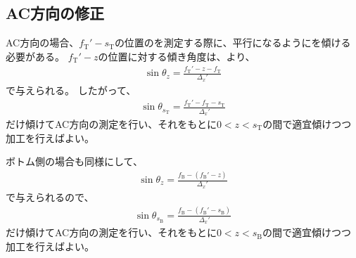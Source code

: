 \subsection{AC方向\OuterDiameter の修正}
AC方向の場合、$f_\mathrm T'-s_\mathrm T$の位置の\OuterDiameter を測定する際に、平行になるように\Table を傾ける必要がある。
$f_\mathrm T'-z$の位置に対する傾き角度は、より、
\begin{align*}
  \sin\theta_z = \frac{f_\mathrm T'-z-f_\mathrm T}{\Delta_x'}
\end{align*}
で与えられる。
したがって、
\begin{align*}
  \sin\theta_{s_\mathrm T} = \frac{f_\mathrm T'-f_\mathrm T-s_\mathrm T}{\Delta_x'}
\end{align*}
だけ傾けてAC方向\OuterDiameter の測定を行い、それをもとに$0 < z < s_\mathrm T$の間で適宜傾けつつ加工を行えばよい。

ボトム側の場合も同様にして、
\begin{align*}
  \sin\theta_z = \frac{f_\mathrm B-(f_\mathrm B'-z)}{\Delta_x'}
\end{align*}
で与えられるので、
\begin{align*}
  \sin\theta_{s_\mathrm B} = \frac{f_\mathrm B-(f_\mathrm B'-s_\mathrm B)}{\Delta_x'}
\end{align*}
だけ傾けてAC方向\OuterDiameter の測定を行い、それをもとに$0 < z < s_\mathrm B$の間で適宜傾けつつ加工を行えばよい。
